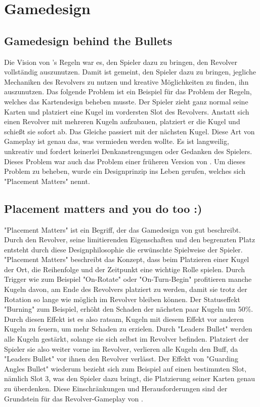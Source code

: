
\section{Gamedesign}\label{sec:differenzierung}

\renewcommand{\kapitelautor}{Autor: Philip Jankovic}


\subsection{Gamedesign behind the Bullets}\label{subsec:gamedesignBehindBullets}

Die Vision von \FF's Regeln war es, den Spieler dazu zu bringen, den Revolver vollständig auszunutzen. Damit ist gemeint,
den Spieler dazu zu bringen, jegliche Mechaniken des Revolvers zu nutzen und kreative Möglichkeiten zu finden, ihn auszunutzen.
Das folgende Problem ist ein Beispiel für das Problem der \FF Regeln, welches das Kartendesign beheben musste.
Der Spieler zieht ganz normal seine Karten und platziert eine Kugel im vordersten Slot des Revolvers.
Anstatt sich einen Revolver mit mehreren Kugeln aufzubauen, platziert er die Kugel und schießt sie sofort ab.
Das Gleiche passiert mit der nächsten Kugel. Diese Art von Gameplay ist genau das, was vermieden werden wollte.
Es ist langweilig, unkreativ und fordert keinerlei Denkanstrengungen oder Gedanken des Spielers.
Dieses Problem war auch das Problem einer früheren Version von \FF. Um dieses Problem zu beheben, wurde ein Designprinzip
ins Leben gerufen, welches sich "Placement Matters" nennt.


\subsection{Placement matters and you do too :)}\label{subsec:placementMatters}

"Placement Matters" ist ein Begriff, der das Gamedesign von \FF gut beschreibt. Durch den Revolver, seine limitierenden
Eigenschaften und den begrenzten Platz entsteht durch diese Designphilosophie die erwünschte Spielweise der Spieler.
"Placement Matters" beschreibt das Konzept, dass beim Platzieren einer Kugel der Ort, die Reihenfolge und der Zeitpunkt
eine wichtige Rolle spielen. Durch Trigger wie zum Beispiel "On-Rotate" oder "On-Turn-Begin" profitieren manche Kugeln davon,
am Ende des Revolvers platziert zu werden, damit sie trotz der Rotation so lange wie möglich im Revolver bleiben können.
Der Statuseffekt "Burning" zum Beispiel, erhöht den Schaden der nächsten paar Kugeln um 50\%.
Durch diesen Effekt ist es also ratsam, Kugeln mit diesem Effekt vor anderen Kugeln zu feuern, um mehr Schaden zu erzielen.
Durch "Leaders Bullet" werden alle Kugeln gestärkt, solange sie sich selbst im Revolver befinden. Platziert der Spieler sie also
weiter vorne im Revolver, verlieren alle Kugeln den Buff, da "Leaders Bullet" vor ihnen den Revolver verlässt.
Der Effekt von "Guarding Angles Bullet" wiederum bezieht sich zum Beispiel auf einen bestimmten Slot, nämlich Slot 3,
was den Spieler dazu bringt, die Platzierung seiner Karten genau zu überdenken. Diese Einschränkungen und Herausforderungen
sind der Grundstein für das Revolver-Gameplay von \FF.


